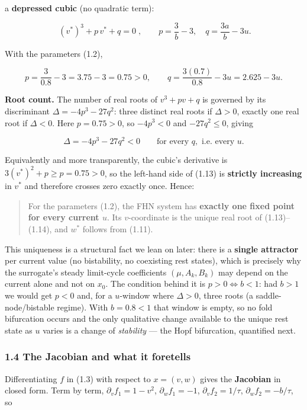 \documentclass[
  11pt,
]{article}
\providecommand{\lt}{<}
\providecommand{\gt}{>}
\begin{document}
a \textbf{depressed cubic} (no quadratic term):

\[
\boxed{\;(v^\ast)^{3}+p\,v^\ast+q=0\;},
\qquad
p=\frac{3}{b}-3,\quad q=\frac{3a}{b}-3u .
\tag{1.13}
\]

With the parameters (1.2),

\[
p=\frac{3}{0.8}-3=3.75-3=0.75\gt 0,
\qquad
q=\frac{3(0.7)}{0.8}-3u=2.625-3u .
\tag{1.14}
\]

\textbf{Root count.} The number of real roots of \(v^3+pv+q\) is
governed by its discriminant \(\Delta=-4p^3-27q^2\): three distinct real
roots if \(\Delta\gt 0\), exactly one real root if \(\Delta\lt 0\). Here
\(p=0.75\gt 0\), so \(-4p^3\lt 0\) and \(-27q^2\le 0\), giving

\[
\Delta=-4p^3-27q^2\lt 0\qquad\text{for every }q,\text{ i.e. every }u .
\tag{1.15}
\]

Equivalently and more transparently, the cubic's derivative is
\(3(v^\ast)^2+p\ge p=0.75\gt 0\), so the left-hand side of (1.13) is
\textbf{strictly increasing} in \(v^\ast\) and therefore crosses zero
exactly once. Hence:

\begin{quote}
For the parameters (1.2), the FHN system has \textbf{exactly one fixed
point for every current \(u\)}. Its \(v\)-coordinate is the unique real
root of (1.13)--(1.14), and \(w^\ast\) follows from (1.11).
\end{quote}

This uniqueness is a structural fact we lean on later: there is a
\textbf{single attractor} per current value (no bistability, no
coexisting rest states), which is precisely why the surrogate's steady
limit-cycle coefficients \((\mu,A_k,B_k)\) may depend on the current
alone and not on \(x_0\). The condition behind it is
\(p\gt 0\iff b\lt 1\): had \(b\gt 1\) we would get \(p\lt 0\) and, for a
\(u\)-window where \(\Delta\gt 0\), three roots (a saddle-node/bistable
regime). With \(b=0.8\lt 1\) that window is empty, so no fold
bifurcation occurs and the only qualitative change available to the
unique rest state as \(u\) varies is a change of \emph{stability} ---
the Hopf bifurcation, quantified next.

\subsubsection{1.4 The Jacobian and what it
foretells}\label{the-jacobian-and-what-it-foretells}

Differentiating \(f\) in (1.3) with respect to \(x=(v,w)\) gives the
\textbf{Jacobian} in closed form. Term by term,
\(\partial_v f_1=1-v^2\), \(\partial_w f_1=-1\),
\(\partial_v f_2=1/\tau\), \(\partial_w f_2=-b/\tau\), so
\end{document}
